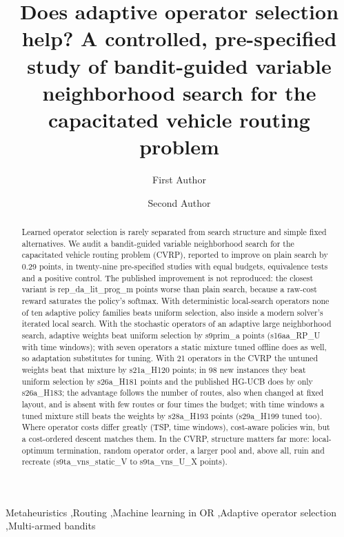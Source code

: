 \documentclass[preprint,11pt,authoryear]{elsarticle}
\begin{document}
\begin{frontmatter}

\title{Does adaptive operator selection help? A controlled, pre-specified study of bandit-guided variable neighborhood search for the capacitated vehicle routing problem}

\author[inst1]{First Author}
\author[inst1]{Second Author}

\begin{abstract}
Learned operator selection is rarely separated from search structure and simple fixed alternatives. We audit a bandit-guided variable neighborhood search for the capacitated vehicle routing problem (CVRP), reported to improve on plain search by 0.29 points, in twenty-nine pre-specified studies with equal budgets, equivalence tests and a positive control. The published improvement is not reproduced: the closest variant is \num{rep_da_lit_prog_m} points worse than plain search, because a raw-cost reward saturates the policy's softmax. With deterministic local-search operators none of ten adaptive policy families beats uniform selection, also inside a modern solver's iterated local search. With the stochastic operators of an adaptive large neighborhood search, adaptive weights beat uniform selection by \num{s9prim_a} points (\num{s16aa_RP_U} with time windows); with seven operators a static mixture tuned offline does as well, so adaptation substitutes for tuning. With 21 operators in the CVRP the untuned weights beat that mixture by \num{s21a_H120} points; in 98 new instances they beat uniform selection by \num{s26a_H181} points and the published HG-UCB does by only \num{s26a_H183}; the advantage follows the number of routes, also when changed at fixed layout, and is absent with few routes or four times the budget; with time windows a tuned mixture still beats the weights by \num{s28a_H193} points (\num{s29a_H199} tuned too). Where operator costs differ greatly (TSP, time windows), cost-aware policies win, but a cost-ordered descent matches them. In the CVRP, structure matters far more: local-optimum termination, random operator order, a larger pool and, above all, ruin and recreate (\num{s9ta_vns_static_V} to \num{s9ta_vns_U_X} points).
\end{abstract}


\begin{keyword}
Metaheuristics \sep Routing \sep Machine learning in OR \sep Adaptive operator selection \sep Multi-armed bandits
\end{keyword}

\end{frontmatter}
\end{document}
